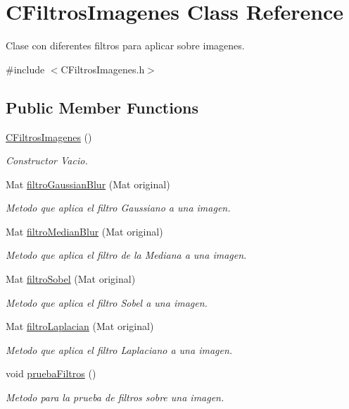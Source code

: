 \hypertarget{classCFiltrosImagenes}{}\section{C\+Filtros\+Imagenes Class Reference}
\label{classCFiltrosImagenes}


Clase con diferentes filtros para aplicar sobre imagenes.  




{\ttfamily \#include $<$C\+Filtros\+Imagenes.\+h$>$}

\subsection*{Public Member Functions}
\begin{DoxyCompactItemize}
\item 
\hyperlink{classCFiltrosImagenes_a6478e212e79b6c075c13f92fd8a500e2}{C\+Filtros\+Imagenes} ()
\begin{DoxyCompactList}\small\item\em Constructor Vacio. \end{DoxyCompactList}\item 
Mat \hyperlink{classCFiltrosImagenes_a4fb22fba45bab47d81904429e8f250f0}{filtro\+Gaussian\+Blur} (Mat original)
\begin{DoxyCompactList}\small\item\em Metodo que aplica el filtro Gaussiano a una imagen. \end{DoxyCompactList}\item 
Mat \hyperlink{classCFiltrosImagenes_a98ef01d019a234d186e1ac47d76c09de}{filtro\+Median\+Blur} (Mat original)
\begin{DoxyCompactList}\small\item\em Metodo que aplica el filtro de la Mediana a una imagen. \end{DoxyCompactList}\item 
Mat \hyperlink{classCFiltrosImagenes_a6ba12449903681d11aba15c065e48e61}{filtro\+Sobel} (Mat original)
\begin{DoxyCompactList}\small\item\em Metodo que aplica el filtro Sobel a una imagen. \end{DoxyCompactList}\item 
Mat \hyperlink{classCFiltrosImagenes_ad9cd3070a534acc987a3bf15555590c2}{filtro\+Laplacian} (Mat original)
\begin{DoxyCompactList}\small\item\em Metodo que aplica el filtro Laplaciano a una imagen. \end{DoxyCompactList}\item 
void \hyperlink{classCFiltrosImagenes_ac5bf9185d05955f93480cba9f158641d}{prueba\+Filtros} ()
\begin{DoxyCompactList}\small\item\em Metodo para la prueba de filtros sobre una imagen. \end{DoxyCompactList}\end{DoxyCompactItemize}


